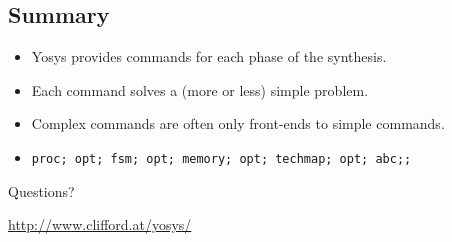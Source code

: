
\subsection{Summary}

\begin{frame}{\subsecname}
\begin{itemize}
\item Yosys provides commands for each phase of the synthesis.
\item Each command solves a (more or less) simple problem.
\item Complex commands are often only front-ends to simple commands.
\item {\tt proc; opt; fsm; opt; memory; opt; techmap; opt; abc;;}
\end{itemize}

\bigskip
\bigskip
\begin{center}
Questions?
\end{center}

\bigskip
\bigskip
\begin{center}
\url{http://www.clifford.at/yosys/}
\end{center}
\end{frame}

